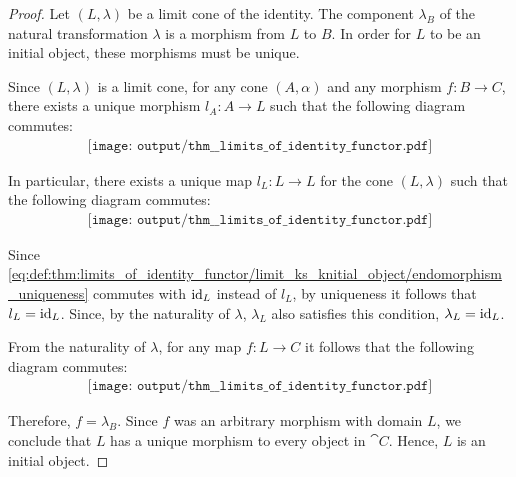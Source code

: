 \begin{proof}
   Let \( (L, \lambda) \) be a limit cone of the identity. The component \( \lambda_B \) of the natural transformation \( \lambda \) is a morphism from \( L \) to \( B \). In order for \( L \) to be an initial object, these morphisms must be unique.

  Since \( (L, \lambda) \) is a limit cone, for any cone \( (A, \alpha) \) and any morphism \( f: B \to C \), there exists a unique morphism \( l_A: A \to L \) such that the following diagram commutes:
  \begin{equation}\label{eq:def:thm:limits_of_identity_functor/limit_ks_knitial_object/limit}
    \begin{aligned}
      \texttt{[image: output/thm\_\_limits\_of\_identity\_functor.pdf]}
    \end{aligned}
  \end{equation}

  In particular, there exists a unique map \( l_L: L \to L \) for the cone \( (L, \lambda) \) such that the following diagram commutes:
  \begin{equation}\label{eq:def:thm:limits_of_identity_functor/limit_ks_knitial_object/endomorphism_uniqueness}
    \begin{aligned}
      \texttt{[image: output/thm\_\_limits\_of\_identity\_functor.pdf]}
    \end{aligned}
  \end{equation}

  Since \eqref{eq:def:thm:limits_of_identity_functor/limit_ks_knitial_object/endomorphism_uniqueness} commutes with \( \operatorname{id}_L \) instead of \( l_L \), by uniqueness it follows that \( l_L = \operatorname{id}_L \). Since, by the naturality of \( \lambda \), \( \lambda_L \) also satisfies this condition, \( \lambda_L = \operatorname{id}_L \).

  From the naturality of \( \lambda \), for any map \( f: L \to C \) it follows that the following diagram commutes:
  \begin{equation}\label{eq:def:thm:limits_of_identity_functor/limit_ks_knitial_object/morphism_uniqueness}
    \begin{aligned}
      \texttt{[image: output/thm\_\_limits\_of\_identity\_functor.pdf]}
    \end{aligned}
  \end{equation}

  Therefore, \( f = \lambda_B \). Since \( f \) was an arbitrary morphism with domain \( L \), we conclude that \( L \) has a unique morphism to every object in \( \cat{C} \). Hence, \( L \) is an initial object.
\end{proof}


